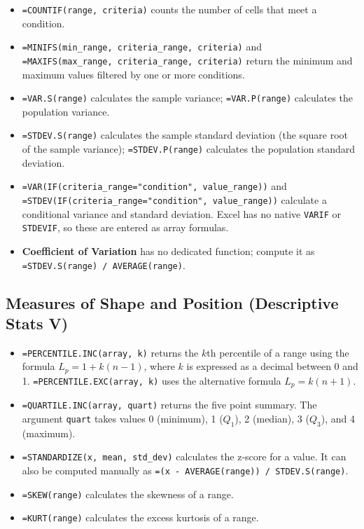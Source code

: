 \documentclass[
  11pt,
  letterpaper,
  DIV=11,
  numbers=noendperiod,
  oneside,
  open=any]{scrreprt}
\begin{document}
\begin{itemize}
\item
  \texttt{=COUNTIF(range,\ criteria)} counts the number of cells that
  meet a condition.
\item
  \texttt{=MINIFS(min\_range,\ criteria\_range,\ criteria)} and
  \texttt{=MAXIFS(max\_range,\ criteria\_range,\ criteria)} return the
  minimum and maximum values filtered by one or more conditions.
\item
  \texttt{=VAR.S(range)} calculates the sample variance;
  \texttt{=VAR.P(range)} calculates the population variance.
\item
  \texttt{=STDEV.S(range)} calculates the sample standard deviation (the
  square root of the sample variance); \texttt{=STDEV.P(range)}
  calculates the population standard deviation.
\item
  \texttt{=VAR(IF(criteria\_range="condition",\ value\_range))} and
  \texttt{=STDEV(IF(criteria\_range="condition",\ value\_range))}
  calculate a conditional variance and standard deviation. Excel has no
  native \texttt{VARIF} or \texttt{STDEVIF}, so these are entered as
  array formulas.
\item
  \textbf{Coefficient of Variation} has no dedicated function; compute
  it as \texttt{=STDEV.S(range)\ /\ AVERAGE(range)}.
\end{itemize}

\subsection*{Measures of Shape and Position (Descriptive Stats
V)}\label{measures-of-shape-and-position-descriptive-stats-v}

\begin{itemize}
\item
  \texttt{=PERCENTILE.INC(array,\ k)} returns the \(k\)th percentile of
  a range using the formula \(L_p = 1 + k(n-1)\), where \(k\) is
  expressed as a decimal between 0 and 1.
  \texttt{=PERCENTILE.EXC(array,\ k)} uses the alternative formula
  \(L_p = k(n+1)\).
\item
  \texttt{=QUARTILE.INC(array,\ quart)} returns the five point summary.
  The argument \texttt{quart} takes values 0 (minimum), 1 (\(Q_1\)), 2
  (median), 3 (\(Q_3\)), and 4 (maximum).
\item
  \texttt{=STANDARDIZE(x,\ mean,\ std\_dev)} calculates the z-score for
  a value. It can also be computed manually as
  \texttt{=(x\ -\ AVERAGE(range))\ /\ STDEV.S(range)}.
\item
  \texttt{=SKEW(range)} calculates the skewness of a range.
\item
  \texttt{=KURT(range)} calculates the excess kurtosis of a range.
\end{itemize}
\end{document}
